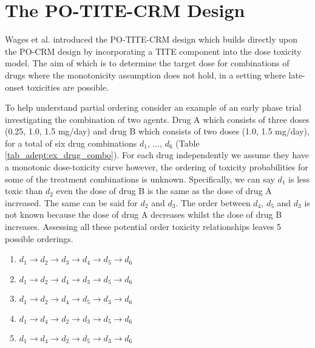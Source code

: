 \section{The PO-TITE-CRM Design}
\label{section2.2} %

Wages et al. \cite{wagesUsingTimetoeventContinual2013} introduced the PO-TITE-CRM design which builds directly upon the PO-CRM design by incorporating a TITE component into the dose toxicity model. The aim of which is to determine the target dose for combinations of drugs where the monotonicity assumption does not hold, in a setting where late-onset toxicities are possible.

To help understand partial ordering consider an example of an early phase trial investigating the combination of two agents. Drug A which consists of three doses (0.25, 1.0, 1.5 mg/day) and drug B which consists of two doses (1.0, 1.5 mg/day), for a total of six drug combinations $d_{1}$, ..., $d_{6}$ (Table \ref{tab_adept:ex_drug_combo}). For each drug independently we assume they have a monotonic dose-toxicity curve however, the ordering of toxicity probabilities for some of the treatment combinations is unknown. Specifically, we can say $d_{1}$ is less toxic than $d_{2}$ even the dose of drug B is the same as the dose of drug A increased. The same can be said for $d_{2}$ and $d_{3}$. The order between $d_{4}$, $d_{5}$ and $d_{3}$ is not known because the dose of drug A decreases whilst the dose of drug B increases. Assessing all these potential order toxicity relationships leaves 5 possible orderings. 

\begin{enumerate}
	\centering
	\item $d_{1} \rightarrow d_{2} \rightarrow d_{3} \rightarrow d_{4} \rightarrow d_{5} \rightarrow d_{6}$
	\item $d_{1} \rightarrow d_{2} \rightarrow d_{4} \rightarrow d_{3} \rightarrow d_{5} \rightarrow d_{6}$
	\item $d_{1} \rightarrow d_{2} \rightarrow d_{4} \rightarrow d_{5} \rightarrow d_{3} \rightarrow d_{6}$
	\item $d_{1} \rightarrow d_{4} \rightarrow d_{2} \rightarrow d_{3} \rightarrow d_{5} \rightarrow d_{6}$
	\item $d_{1} \rightarrow d_{4} \rightarrow d_{2} \rightarrow d_{5} \rightarrow d_{3} \rightarrow d_{6}$
\end{enumerate}

